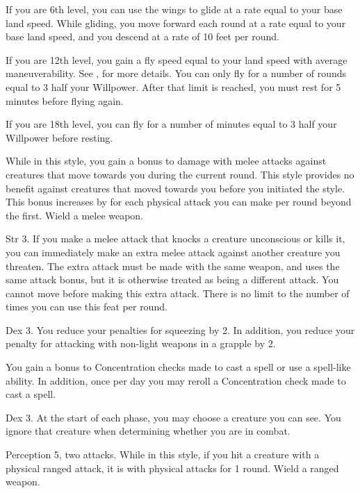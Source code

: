 If you are 6th level, you can use the wings to glide at a rate equal to your base land speed.
While gliding, you move forward each round at a rate equal to your base land speed, and you descend at a rate of 10 feet per round.

If you are 12th level, you gain a fly speed equal to your land speed with average maneuverability.
See , for more details.
You can only fly for a number of rounds equal to 3 \add half your Willpower.
After that limit is reached, you must rest for 5 minutes before flying again.

If you are 18th level, you can fly for a number of minutes equal to 3 \add half your Willpower before resting.

\featben While in this style, you gain a  bonus to damage with melee attacks against creatures that move towards you during the current round.
This style provides no benefit against creatures that moved towards you before you initiated the style.
This bonus increases by  for each physical attack you can make per round beyond the first.
\stylereq Wield a melee weapon.

\featpres
Str 3.
\featben If you make a melee attack that knocks a creature unconscious or kills it, you can immediately make an extra melee attack against another creature you threaten.
The extra attack must be made with the same weapon, and uses the same attack bonus, but it is otherwise treated as being a different attack.
You cannot move before making this extra attack.
There is no limit to the number of times you can use this feat per round.

\featpre Dex 3.
\featben You reduce your penalties for squeezing by 2. In addition, you reduce your penalty for attacking with non-light weapons in a grapple by 2.

\featben You gain a  bonus to Concentration checks made to cast a spell or use a spell-like ability.
In addition, once per day you may reroll a Concentration check made to cast a spell.

\featpre Dex 3.
\featben At the start of each phase, you may choose a creature you can see.
You ignore that creature when determining whether you are \engaged in combat.

\featpres Perception 5, two attacks.
\featben While in this style, if you hit a creature with a physical ranged attack, it is \impaired with physical attacks for 1 round.
\stylereq Wield a ranged weapon.

